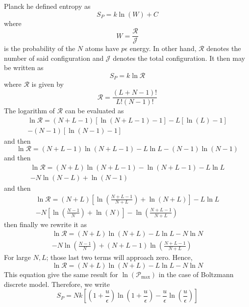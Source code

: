 \documentclass[../../../Main.tex]{subfiles}
\begin{document}
Planck he defined entropy as 
\begin{equation*}
    S_P=k \ln (W)+C
\end{equation*}
where
\begin{equation*}
    W=\frac{\mathcal{R}}{\mathcal{J}}
\end{equation*}
is the probability of the $N$ atoms have $p\epsilon$ energy. In other hand, $\mathcal{R}$ denotes the number of said configuration and $\mathcal{J}$ denotes the total configuration. It then may be written as
\begin{equation*}
    S_P=k \ln \mathcal{R}
\end{equation*}
where $\mathcal{R}$ is given by 
\begin{equation*}
    \mathcal{R}=\frac{(L+N-1)!}{L!(N-1)!}
\end{equation*}
The logarithm of $\mathcal{R}$ can be evaluated as
\begin{multline*}
    \ln \mathcal{R}=(N+L-1)[\ln (N+L-1)-1]-L[\ln (L)-1]\\
    -(N-1)[\ln(N-1)-1]
\end{multline*}
and then
\begin{equation*}
    \ln \mathcal{R}=(N+L-1)\ln(N+L-1)-L\ln L-(N-1)\ln(N-1)
\end{equation*}
and then 
\begin{multline*}
    \ln \mathcal{R}=(N+L)\ln(N+L-1)-\ln(N+L-1)-L\ln L \\
    -N\ln(N-L)+\ln(N-1)
\end{multline*}
and then 
\begin{multline*}
    \ln \mathcal{R}=(N+L)\left[\ln\left(\frac{N+L-1}{N+L}\right) +\ln\left(N+L\right)\right]-L\ln L \\
    -N\left[\ln \left(\frac{N-1}{N}\right)+\ln (N)\right]-\ln\left(\frac{N+L-1}{N+L}\right)
\end{multline*}
then finally we rewrite it as
\begin{multline*}
    \ln \mathcal{R}=(N+L)\ln(N+L) -L\ln L - N\ln N \\
    -N\ln\left(\frac{N-1}{N}\right) +(N+L-1)\ln\left(\frac{N+L-1}{N+L}\right)
\end{multline*}
For large $N,L$; those last two terms will approach zero. Hence,
\begin{equation*}
    \ln \mathcal{R}=(N+L)\ln(N+L) -L\ln L - N\ln N 
\end{equation*}
This equation give the same result for $\ln(\mathcal{P}_\text{max})$ in the case of Boltzmann discrete model. Therefore, we write 
\begin{equation*}
    S_P=Nk \left[\left(1+\frac{u}{\epsilon} \right) \ln \left(1+\frac{u}{\epsilon}\right)-\frac{u}{\epsilon}\ln\left(\frac{u}{\epsilon}\right)\right]
\end{equation*}
\end{document}
